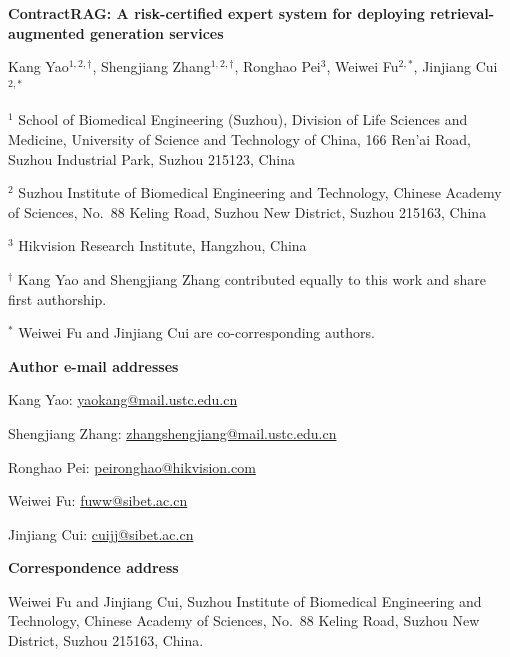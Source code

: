 \documentclass[11pt]{article}
\begin{document}
\begin{center}
{\Large\bfseries ContractRAG: A risk-certified expert system for
deploying retrieval-augmented generation services\par}

\vspace{12mm}
{\large Kang Yao$^{1,2,\dagger}$,
Shengjiang Zhang$^{1,2,\dagger}$,
Ronghao Pei$^{3}$,
Weiwei Fu$^{2,*}$,
Jinjiang Cui$^{2,*}$\par}
\end{center}

\vspace{8mm}
$^{1}$ School of Biomedical Engineering (Suzhou), Division of Life
Sciences and Medicine, University of Science and Technology of China,
166 Ren'ai Road, Suzhou Industrial Park, Suzhou 215123, China

$^{2}$ Suzhou Institute of Biomedical Engineering and Technology,
Chinese Academy of Sciences, No.\ 88 Keling Road, Suzhou New District,
Suzhou 215163, China

$^{3}$ Hikvision Research Institute, Hangzhou, China

\vspace{5mm}
$^{\dagger}$ Kang Yao and Shengjiang Zhang contributed equally to this
work and share first authorship.

$^{*}$ Weiwei Fu and Jinjiang Cui are co-corresponding authors.

\vspace{8mm}
\textbf{Author e-mail addresses}

Kang Yao: \href{mailto:yaokang@mail.ustc.edu.cn}
{yaokang@mail.ustc.edu.cn}

Shengjiang Zhang:
\href{mailto:zhangshengjiang@mail.ustc.edu.cn}
{zhangshengjiang@mail.ustc.edu.cn}

Ronghao Pei:
\href{mailto:peironghao@hikvision.com}
{peironghao@hikvision.com}

Weiwei Fu:
\href{mailto:fuww@sibet.ac.cn}{fuww@sibet.ac.cn}

Jinjiang Cui:
\href{mailto:cuijj@sibet.ac.cn}{cuijj@sibet.ac.cn}

\vspace{8mm}
\textbf{Correspondence address}

Weiwei Fu and Jinjiang Cui, Suzhou Institute of Biomedical Engineering
and Technology, Chinese Academy of Sciences, No.\ 88 Keling Road,
Suzhou New District, Suzhou 215163, China.
\end{document}
